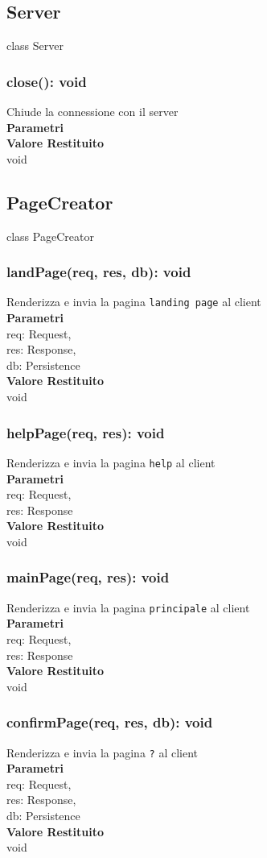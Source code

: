 \documentclass[a4paper, 12pt]{article}
\begin{document}
\subsection{Server}
class Server
\subsubsection{close(): void}
Chiude la connessione con il server\\
\textbf{Parametri}\\
\textbf{Valore Restituito}\\
void

\subsection{PageCreator}
class PageCreator
\subsubsection{landPage(req, res, db): void} 
Renderizza e invia la pagina \texttt{landing page} al client\\
\textbf{Parametri}\\
req: Request,\\
res: Response,\\
db: Persistence\\
\textbf{Valore Restituito}\\
void
\subsubsection{helpPage(req, res): void}
Renderizza e invia la pagina \texttt{help} al client\\
\textbf{Parametri}\\
req: Request,\\
res: Response\\
\textbf{Valore Restituito}\\
void
\subsubsection{mainPage(req, res): void}
Renderizza e invia la pagina \texttt{principale} al client\\
\textbf{Parametri}\\
req: Request,\\
res: Response\\
\textbf{Valore Restituito}\\
void
\subsubsection{confirmPage(req, res, db): void}
Renderizza e invia la pagina \texttt{?} al client\\
\textbf{Parametri}\\
req: Request,\\
res: Response,\\
db: Persistence\\
\textbf{Valore Restituito}\\
void
\end{document}
